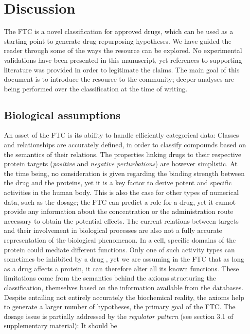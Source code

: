 \documentclass{bioinfo}
\begin{document}
\section{Discussion}

The FTC is a novel classification for approved drugs, which can be used as a starting point to 
generate drug repurposing hypotheses. We have guided the reader through some of the ways the resource 
can be explored. No experimental validations have been presented in this manuscript, yet references to 
supporting literature was provided in order to legitimate the claims. The main goal of this document is to 
introduce the resource to the community; deeper analyses are being performed over the classification at the time of writing.

\subsection{Biological assumptions}
An asset of the FTC is its ability to handle efficiently categorical data: Classes and relationships 
are accurately defined, in order to classify compounds based on the semantics of their relations. The properties 
linking drugs to their respective protein targets (\emph{positive} and \emph{negative perturbations}) are however simplistic. At the 
time being, no consideration is given regarding the binding strength between the drug and the proteins, yet it is a key 
factor to derive potent and specific activities in the human body. This is also the case for other types of numerical data, 
such as the dosage; the FTC can predict a role for a drug, yet it cannot provide any information about the concentration or 
the administration route necessary to obtain the potential effects. The current relations between targets and their involvement 
in biological processes are also not a fully accurate representation of the biological phenomenon. In a cell, specific domains 
of the protein could mediate different functions. Only one of such activity types can sometimes be inhibited 
by a drug \citep{kruger}, yet we are assuming in the FTC that as long as a drug affects a protein, 
it can therefore alter all its known functions.
These limitations come from the semantics behind the axioms structuring the classification, themselves based on the 
information available from the databases. Despite entailing not entirely accurately the 
biochemical reality, the axioms help to generate a larger number of hypotheses, the primary goal of the FTC. The dosage 
issue is partially addressed by the \emph{regulator pattern} (see section 3.1 of supplementary material): It should be 
\end{document}
